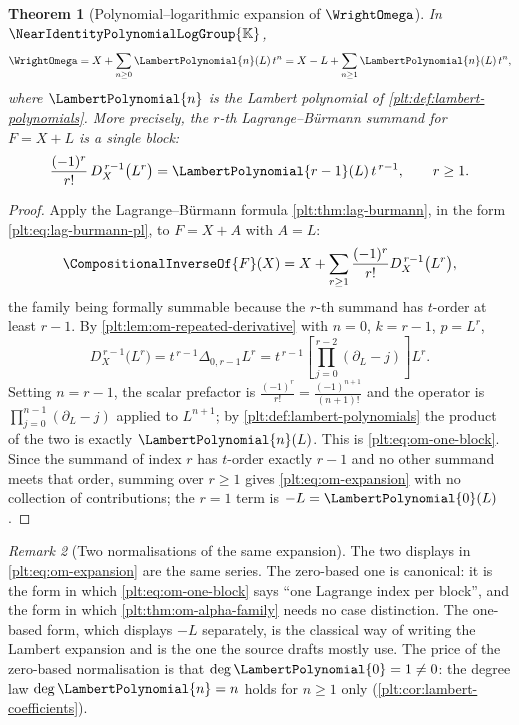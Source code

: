 \documentclass[11pt,oneside]{article}
\theoremstyle{plain}
\newtheorem{theorem}{Theorem}[section]
\theoremstyle{definition}
\theoremstyle{remark}
\newtheorem{remark}[theorem]{Remark}
\newcommand{\K}{\mathbb{K}}
\newcommand{\Gnear}{\NearIdentityPolynomialLogGroup{\K}} %
\newcommand{\DX}{D_{X}}                                  %
\newcommand{\shiftop}[2]{\Delta_{#1,#2}}                 %
\newcommand{\rev}[1]{\CompositionalInverseOf{#1}}
\newcommand{\LamP}[1]{\LambertPolynomial{#1}}
\begin{document}
\begin{theorem}[Polynomial--logarithmic expansion of \(\WrightOmega\)]
\label{plt:thm:om-expansion}
In \(\Gnear\),
\begin{equation}\label{plt:eq:om-expansion}
 \WrightOmega
 =X+\sum_{n\ge0}\LamP{n}(L)\,t^{n}
 =X-L+\sum_{n\ge1}\LamP{n}(L)\,t^{n},
\end{equation}
where \(\LamP{n}\) is the Lambert polynomial of
\cref{plt:def:lambert-polynomials}.  More precisely, the \(r\)-th
Lagrange--B\"urmann summand for \(F=X+L\) is a \emph{single} block:
\begin{equation}\label{plt:eq:om-one-block}
 \frac{(-1)^{r}}{r!}\,\DX^{\,r-1}\bigl(L^{r}\bigr)=\LamP{r-1}(L)\,t^{\,r-1},
 \qquad r\ge1 .
\end{equation}
\end{theorem}

\begin{proof}
Apply the Lagrange--B\"urmann formula \cref{plt:thm:lag-burmann}, in the form
\eqref{plt:eq:lag-burmann-pl}, to
\(F=X+A\) with \(A=L\):
\[
 \rev{F}(X)=X+\sum_{r\ge1}\frac{(-1)^{r}}{r!}\DX^{\,r-1}\bigl(L^{r}\bigr),
\]
the family being formally summable because the \(r\)-th summand has
\(t\)-order at least \(r-1\).  By
\cref{plt:lem:om-repeated-derivative} with \(n=0\), \(k=r-1\), \(p=L^{r}\),
\[
 \DX^{\,r-1}\bigl(L^{r}\bigr)=t^{\,r-1}\shiftop{0}{r-1}L^{r}
 =t^{\,r-1}\left[\prod_{j=0}^{r-2}(\partial_L-j)\right]L^{r}.
\]
Setting \(n=r-1\), the scalar prefactor is
\(\frac{(-1)^{r}}{r!}=\frac{(-1)^{n+1}}{(n+1)!}\) and the operator is
\(\prod_{j=0}^{n-1}(\partial_L-j)\) applied to \(L^{n+1}\); by
\cref{plt:def:lambert-polynomials} the product of the two is exactly
\(\LamP{n}(L)\).  This is \eqref{plt:eq:om-one-block}.  Since the summand of
index \(r\) has \(t\)-order exactly \(r-1\) and no other summand meets that
order, summing over \(r\ge1\) gives \eqref{plt:eq:om-expansion} with no
collection of contributions; the \(r=1\) term is \(-L=\LamP{0}(L)\).
\end{proof}

\begin{remark}[Two normalisations of the same expansion]
\label{plt:rmk:om-normalisation}
The two displays in \eqref{plt:eq:om-expansion} are the same series.  The
zero-based one is canonical: it is the form in which
\eqref{plt:eq:om-one-block} says ``one Lagrange index per block'', and the
form in which \cref{plt:thm:om-alpha-family} needs no case distinction.  The
one-based form, which displays \(-L\) separately, is the classical way of
writing the Lambert expansion and is the one the source drafts mostly use.
The price of the zero-based normalisation is that
\(\deg\LamP{0}=1\ne0\): the degree law \(\deg\LamP{n}=n\) holds for
\(n\ge1\) only (\cref{plt:cor:lambert-coefficients}).
\end{remark}
\end{document}
